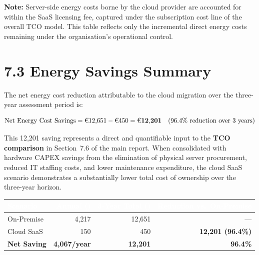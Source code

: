 \vspace{0.5em}
\textbf{Note:} Server-side energy costs borne by the cloud provider are
accounted for within the SaaS licensing fee, captured under the
subscription cost line of the overall TCO model. This table reflects only
the incremental direct energy costs remaining under the organisation's
operational control.

\section{7.3 Energy Savings Summary}

The net energy cost reduction attributable to the cloud migration over the
three-year assessment period is:

\[
\text{Net Energy Cost Savings}
  = \text{\texteuro{}}12{,}651 - \text{\texteuro{}}450
  = \mathbf{\text{\texteuro{}}12{,}201}
  \quad (96.4\%\ \text{reduction over 3 years})
\]

This \texteuro{}12,201 saving represents a direct and quantifiable input to the
\textbf{TCO comparison} in Section~7.6 of the main report. When
consolidated with hardware CAPEX savings from the elimination of physical
server procurement, reduced IT staffing costs, and lower maintenance
expenditure, the cloud SaaS scenario demonstrates a substantially lower
total cost of ownership over the three-year horizon.

\vspace{0.5em}
\begin{tabularx}{\textwidth}{X r r r}
\toprule
\rowcolor{headerrow}
\textcolor{white}{\textbf{Scenario}} &
\textcolor{white}{\textbf{Annual (\texteuro{})}} &
\textcolor{white}{\textbf{3-Year Total (\texteuro{})}} &
\textcolor{white}{\textbf{Reduction vs.\ On-Premise}} \\
\midrule
\rowcolor{rowalt}
  On-Premise  & \texteuro{}4{,}217 & \texteuro{}12{,}651 & --- \\
  Cloud SaaS  & \texteuro{}150     & \texteuro{}450      & \textbf{\texteuro{}12{,}201 (96.4\%)} \\
\midrule
\rowcolor{palegreen}
  \textbf{Net Saving}
  & \textbf{\texteuro{}4{,}067/year}
  & \textbf{\texteuro{}12{,}201}
  & \textbf{96.4\%} \\
\bottomrule
\end{tabularx}

\newpage

